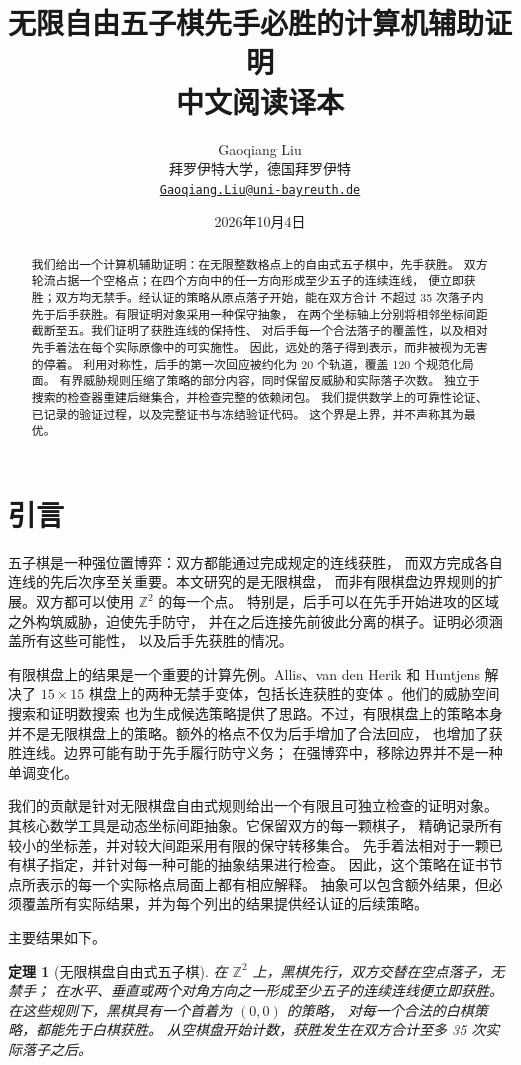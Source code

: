 \documentclass[11pt]{article}
\title{无限自由五子棋先手必胜的计算机辅助证明\\\large 中文阅读译本}
\author{Gaoqiang Liu\\拜罗伊特大学，德国拜罗伊特\\\href{mailto:Gaoqiang.Liu@uni-bayreuth.de}{\texttt{Gaoqiang.Liu@uni-bayreuth.de}}}
\date{2026年10月4日}
\newtheorem{theorem}{定理}[section]
\theoremstyle{definition}
\theoremstyle{remark}
\newcommand{\Z}{\mathbb Z}
\begin{document}
\maketitle

\begin{abstract}
我们给出一个计算机辅助证明：在无限整数格点上的自由式五子棋中，先手获胜。
双方轮流占据一个空格点；在四个方向中的任一方向形成至少五子的连续连线，
便立即获胜；双方均无禁手。经认证的策略从原点落子开始，能在双方合计
不超过 35 次落子内先于后手获胜。有限证明对象采用一种保守抽象，
在两个坐标轴上分别将相邻坐标间距截断至五。我们证明了获胜连线的保持性、
对后手每一个合法落子的覆盖性，以及相对先手着法在每个实际原像中的可实施性。
因此，远处的落子得到表示，而非被视为无害的停着。
利用对称性，后手的第一次回应被约化为 20 个轨道，覆盖 120 个规范化局面。
有界威胁规则压缩了策略的部分内容，同时保留反威胁和实际落子次数。
独立于搜索的检查器重建后继集合，并检查完整的依赖闭包。
我们提供数学上的可靠性论证、已记录的验证过程，以及完整证书与冻结验证代码。
这个界是上界，并不声称其为最优。
\end{abstract}

\section{引言}
\label{sec:intro}
五子棋是一种强位置博弈：双方都能通过完成规定的连线获胜，
而双方完成各自连线的先后次序至关重要。本文研究的是无限棋盘，
而非有限棋盘边界规则的扩展。双方都可以使用 $\Z^2$ 的每一个点。
特别是，后手可以在先手开始进攻的区域之外构筑威胁，迫使先手防守，
并在之后连接先前彼此分离的棋子。证明必须涵盖所有这些可能性，
以及后手先获胜的情况。

有限棋盘上的结果是一个重要的计算先例。Allis、van den Herik 和 Huntjens
解决了 $15\times15$ 棋盘上的两种无禁手变体，包括长连获胜的变体
\cite{Allis1993,Allis1996}。他们的威胁空间搜索和证明数搜索
也为生成候选策略提供了思路。不过，有限棋盘上的策略本身
并不是无限棋盘上的策略。额外的格点不仅为后手增加了合法回应，
也增加了获胜连线。边界可能有助于先手履行防守义务；
在强博弈中，移除边界并不是一种单调变化。

我们的贡献是针对无限棋盘自由式规则给出一个有限且可独立检查的证明对象。
其核心数学工具是动态坐标间距抽象。它保留双方的每一颗棋子，
精确记录所有较小的坐标差，并对较大间距采用有限的保守转移集合。
先手着法相对于一颗已有棋子指定，并针对每一种可能的抽象结果进行检查。
因此，这个策略在证书节点所表示的每一个实际格点局面上都有相应解释。
抽象可以包含额外结果，但必须覆盖所有实际结果，并为每个列出的结果提供经认证的后续策略。

主要结果如下。
\begin{theorem}[无限棋盘自由式五子棋]
\label{thm:main}
在 $\Z^2$ 上，黑棋先行，双方交替在空点落子，无禁手；
在水平、垂直或两个对角方向之一形成至少五子的连续连线便立即获胜。
在这些规则下，黑棋具有一个首着为 $(0,0)$ 的策略，
对每一个合法的白棋策略，都能先于白棋获胜。
从空棋盘开始计数，获胜发生在双方合计至多 35 次实际落子之后。
\end{theorem}
\end{document}
